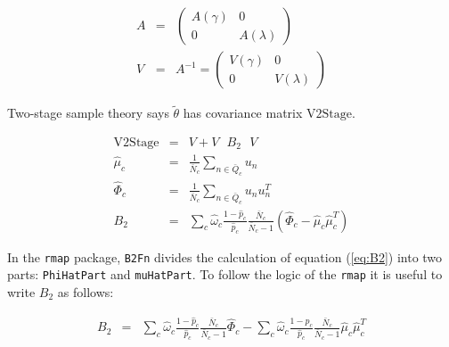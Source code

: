 \documentclass[11pt]{article}
\begin{document}
\begin{eqnarray}
A & = & \left( \begin{array}{cc}
                            A(\gamma) & 0\\
                            0 & A(\lambda)
                       \end{array} 
                     \right) \\
V & = & A^{-1} =  \left( \begin{array}{cc}
                                        V(\gamma) & 0 \\
                                        0 & V(\lambda)
                                      \end{array} 
                                    \right)
\end{eqnarray}

Two-stage sample theory says $\tilde{\theta}$ has covariance matrix
$\mbox{V2Stage}$.

\begin{eqnarray}
\mbox{V2Stage} & = & 
                                 V + V \mbox{ } B_2 \mbox{ } V\\
\hat{\mu}_c & = & \frac{1}{\bar{N}_c} \sum_{n \in \bar{Q}_c}u_n\\
\hat{\Phi}_c & = & \frac{1}{\bar{N}_c} \sum_{n \in
                                 \bar{Q}_c}u_nu_n^T\\
B_2 & = & \sum_c \hat{\omega}_c
                           \frac{1-\hat{p}_c}{\hat{p}_c}
                           \frac{\bar{N}_c}{\bar{N}_c - 1}
                           (\hat{\Phi}_c -
                           \hat{\mu}_c\hat{\mu}_c^T)  \label{eq:B2}
\end{eqnarray}

In the \texttt{rmap} package, \texttt{B2Fn} divides the calculation of 
equation (\ref{eq:B2}) into two parts: \texttt{PhiHatPart} and
\texttt{muHatPart}.  To follow the logic of the \texttt{rmap} it is
useful to write $B_2$ as follows:

\begin{eqnarray}
B_2 & = & \sum_c \hat{\omega}_c
                           \frac{1-\hat{p}_c}{\hat{p}_c}
                           \frac{\bar{N}_c}{\bar{N}_c - 1} 
                           \hat{\Phi}_c
              - \sum_c \hat{\omega}_c
                           \frac{1-\hat{p}_c}{\hat{p}_c}
                           \frac{\bar{N}_c}{\bar{N}_c - 1} 
                           \hat{\mu}_c\hat{\mu}_c^T \label{eq:B2num2}
\end{eqnarray}
\end{document}
